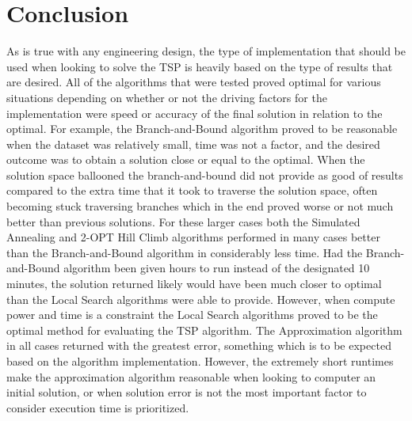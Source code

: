 \documentclass[format=sigconf]{acmart}
\begin{document}
\section{Conclusion}
As is true with any engineering design, the type of implementation that should be used when looking to solve the TSP is heavily based on the type of results that are desired. All 
of the algorithms that were tested proved optimal for various situations depending on whether or not the driving factors for the implementation were speed or accuracy of the final solution 
in relation to the optimal. For example, the Branch-and-Bound algorithm proved to be reasonable when the dataset was relatively small, time was not a factor, and the desired outcome was to obtain a solution 
close or equal to the optimal. When the solution space ballooned the branch-and-bound did not provide as good of results compared to the extra time that it took to traverse the solution space, often becoming stuck 
traversing branches which in the end proved worse or not much better than previous solutions. For these larger cases both the Simulated Annealing and 2-OPT Hill Climb algorithms performed in many cases better than the Branch-and-Bound 
algorithm in considerably less time. Had the Branch-and-Bound algorithm been given hours to run instead of the designated 10 minutes, the solution returned likely would have been much closer to optimal than the Local Search algorithms were able 
to provide. However, when compute power and time is a constraint the Local Search algorithms proved to be the optimal method for evaluating the TSP algorithm. The Approximation algorithm in all cases returned with the greatest error, something 
which is to be expected based on the algorithm implementation. However, the extremely short runtimes make the approximation algorithm reasonable when looking to computer an initial solution, or when solution error is not the most important factor to consider 
execution time is prioritized.


\end{document}
